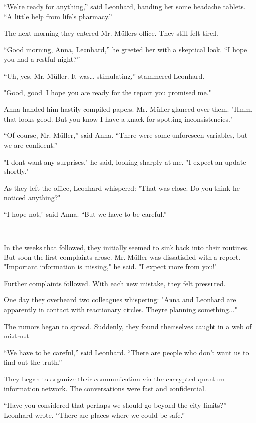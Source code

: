 \documentclass[
]{article}
\begin{document}
``We're ready for anything,'' said Leonhard, handing her some headache tablets. ``A little help from life's pharmacy.''

The next morning they entered Mr. Müller\textquotesingle s office. They still felt tired.

``Good morning, Anna, Leonhard,'' he greeted her with a skeptical look. ``I hope you had a restful night?''

``Uh, yes, Mr. Müller. It was\ldots{} stimulating,'' stammered Leonhard.

"Good, good. I hope you are ready for the report you promised me."

Anna handed him hastily compiled papers. Mr. Müller glanced over them. "Hmm, that looks good. But you know I have a knack for spotting inconsistencies."

``Of course, Mr. Müller,'' said Anna. ``There were some unforeseen variables, but we are confident.''

"I don\textquotesingle t want any surprises," he said, looking sharply at me. "I expect an update shortly."

As they left the office, Leonhard whispered: "That was close. Do you think he noticed anything?"

``I hope not,'' said Anna. ``But we have to be careful.''

-\/-\/-

In the weeks that followed, they initially seemed to sink back into their routines. But soon the first complaints arose. Mr. Müller was dissatisfied with a report. "Important information is missing," he said. "I expect more from you!"

Further complaints followed. With each new mistake, they felt pressured.

One day they overheard two colleagues whispering: "Anna and Leonhard are apparently in contact with reactionary circles. They\textquotesingle re planning something..."

The rumors began to spread. Suddenly, they found themselves caught in a web of mistrust.

``We have to be careful,'' said Leonhard. ``There are people who don't want us to find out the truth.''

They began to organize their communication via the encrypted quantum information network. The conversations were fast and confidential.

``Have you considered that perhaps we should go beyond the city limits?'' Leonhard wrote. ``There are places where we could be safe.''
\end{document}
